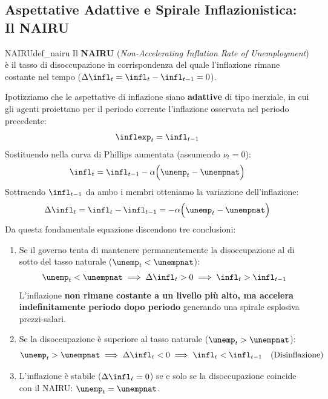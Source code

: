 \subsection{Aspettative Adattive e Spirale Inflazionistica: Il NAIRU}

\begin{definizione}{NAIRU}{def_nairu}
Il \textbf{NAIRU} (\textit{Non-Accelerating Inflation Rate of Unemployment}) è il tasso di disoccupazione in corrispondenza del quale l'inflazione rimane costante nel tempo ($\Delta \infl_t = \infl_t - \infl_{t-1} = 0$).
\end{definizione}

\begin{dimostrazione}
Ipotizziamo che le aspettative di inflazione siano \textbf{adattive} di tipo inerziale, in cui gli agenti proiettano per il periodo corrente l'inflazione osservata nel periodo precedente:
\begin{equation}
    \inflexp_t = \infl_{t-1}
\end{equation}
Sostituendo nella curva di Phillips aumentata (assumendo $\nu_t = 0$):
\begin{equation}
    \infl_t = \infl_{t-1} - \alpha \Big( \unemp_t - \unempnat \Big)
\end{equation}
Sottraendo $\infl_{t-1}$ da ambo i membri otteniamo la variazione dell'inflazione:
\begin{equation}
    \Delta \infl_t = \infl_t - \infl_{t-1} = -\alpha \Big( \unemp_t - \unempnat \Big) \label{eq:nairu_accel}
\end{equation}
Da questa fondamentale equazione discendono tre conclusioni:
\begin{enumerate}
    \item Se il governo tenta di mantenere permanentemente la disoccupazione al di sotto del tasso naturale ($\unemp_t < \unempnat$):
    \begin{equation}
        \unemp_t < \unempnat \implies \Delta \infl_t > 0 \implies \infl_t > \infl_{t-1}
    \end{equation}
    L'inflazione \textbf{non rimane costante a un livello più alto, ma accelera indefinitamente periodo dopo periodo} generando una spirale esplosiva prezzi-salari.
    \item Se la disoccupazione è superiore al tasso naturale ($\unemp_t > \unempnat$):
    \begin{equation}
        \unemp_t > \unempnat \implies \Delta \infl_t < 0 \implies \infl_t < \infl_{t-1} \quad (\text{Disinflazione})
    \end{equation}
    \item L'inflazione è stabile ($\Delta \infl_t = 0$) se e solo se la disoccupazione coincide con il NAIRU: $\unemp_t = \unempnat$.
\end{enumerate}
\end{dimostrazione}

